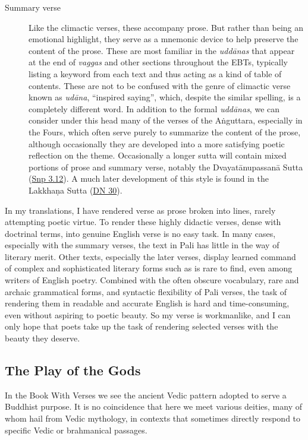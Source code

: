 \documentclass[12pt,openany]{book}%
\begin{document}
\begin{description}
\item[Summary verse] Like the climactic verses, these accompany prose. But rather than being an emotional highlight, they serve as a mnemonic device to help preserve the content of the prose. These are most familiar in the \textit{\textsanskrit{uddānas}} that appear at the end of \textit{vaggas} and other sections throughout the EBTs, typically listing a keyword from each text and thus acting as a kind of table of contents. These are not to be confused with the genre of climactic verse known as \textit{\textsanskrit{udāna}}, “inspired saying”, which, despite the similar spelling, is a completely different word. In addition to the formal \textit{\textsanskrit{uddānas}}, we can consider under this head many of the verses of the \textsanskrit{Aṅguttara}, especially in the Fours, which often serve purely to summarize the content of the prose, although occasionally they are developed into a more satisfying poetic reflection on the theme. Occasionally a longer sutta will contain mixed portions of prose and summary verse, notably the \textsanskrit{Dvayatānupassanā} Sutta (\href{https://suttacentral.net/snp3.12}{Snp 3.12}). A much later development of this style is found in the \textsanskrit{Lakkhaṇa} Sutta (\href{https://suttacentral.net/dn30}{DN 30}).%
\end{description}

In my translations, I have rendered verse as prose broken into lines, rarely attempting poetic virtue. To render these highly didactic verses, dense with doctrinal terms, into genuine English verse is no easy task. In many cases, especially with the summary verses, the text in Pali has little in the way of literary merit. Other texts, especially the later verses, display learned command of complex and sophisticated literary forms such as is rare to find, even among writers of English poetry. Combined with the often obscure vocabulary, rare and archaic grammatical forms, and syntactic flexibility of Pali verses, the task of rendering them in readable and accurate English is hard and time-consuming, even without aspiring to poetic beauty. So my verse is workmanlike, and I can only hope that poets take up the task of rendering selected verses with the beauty they deserve.

\subsection*{The Play of the Gods}

In the Book With Verses we see the ancient Vedic pattern adopted to serve a Buddhist purpose. It is no coincidence that here we meet various deities, many of whom hail from Vedic mythology, in contexts that sometimes directly respond to specific Vedic or brahmanical passages.
\end{document}
